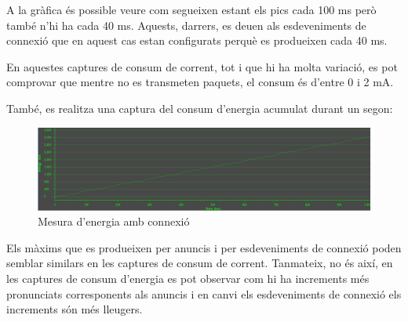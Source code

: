 A la gràfica és possible veure com segueixen estant els pics cada 100 ms però també n'hi ha cada 40 ms.
Aquests, darrers, es deuen als esdeveniments de connexió que en aquest cas estan configurats perquè es produeixen cada 40 ms.

En aquestes captures de consum de corrent, tot i que hi ha molta variació, es pot comprovar que mentre no es transmeten paquets, el consum és d'entre 0 i 2 mA.

També, es realitza una captura del consum d'energia acumulat durant un segon:

\begin{figure}[!h]
	\begin{center}
		\includegraphics[width=\textwidth]{./images/consum_energia_connected_energy.png}
		\caption{Mesura d'energia amb connexió}
		\label{energy_trace2}
	\end{center}
\end{figure}

Els màxims que es produeixen per anuncis i per esdeveniments de connexió poden semblar similars en les captures de consum de corrent.
Tanmateix, no és així, en les captures de consum d'energia es pot observar com hi ha increments més pronunciats corresponents als anuncis i en canvi els esdeveniments de connexió els increments són més lleugers.

